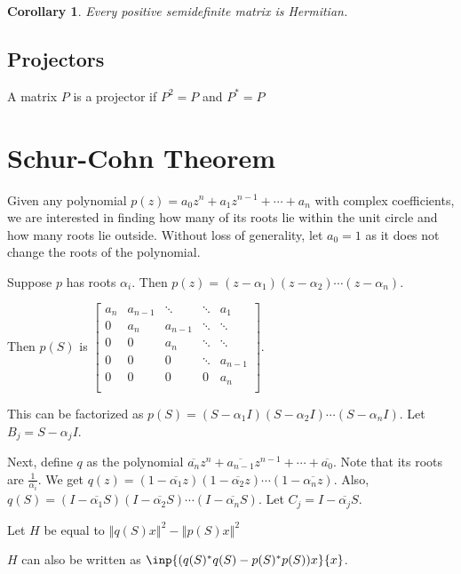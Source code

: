 \documentclass[twofold]{article}
\newcommand*\conj[1]{\overline{#1}}
\newcommand*\adj[1]{#1^*}
\newcommand*\norm[1]{\left \Vert #1 \right\Vert}
\theoremstyle{plain}
\newtheorem*{corollary}{Corollary}
\theoremstyle{definition}
\begin{document}
\begin{corollary}Every positive semidefinite matrix is Hermitian.\end{corollary}

\subsection{Projectors}
A matrix \(P\) is a projector if \(P^2 = P\) and \(\adj{P} = P\)


\section{Schur-Cohn Theorem}

Given any polynomial \(p(z) = a_0 z^n + a_1z^{n-1} + \cdots + a_n\) with complex coefficients, we are interested in finding how many of its roots lie within the unit circle and how many roots lie outside. Without loss of generality, let \(a_0 = 1\) as it does not change the roots of the polynomial. 

Suppose \(p\) has roots \(\alpha_i\). Then \(p(z) = (z - \alpha_1) (z - \alpha_2) \cdots (z - \alpha_n)\). 

 Then \(p(S) \) is \( \begin{bmatrix} 

a_n & a_{n-1} & \ddots & \ddots & a_1 \\
0 & a_n & a_{n-1} & \ddots & \ddots \\
0 & 0 & a_n & \ddots & \ddots \\
0 & 0 & 0 &\ddots & a_{n-1} \\
0 & 0 & 0 & 0 & a_n \\ 
\end{bmatrix}\). 


This can be factorized as \(p(S) = (S - \alpha_1I) (S - \alpha_2 I) \cdots (S - \alpha_n I)\). Let \(B_j = S - \alpha_jI\).

Next, define \(q\) as the polynomial \(\conj{a_n}z^n + \conj{a_{n-1}}z^{n-1} + \cdots + \conj{a_0}\). Note that its roots are \(\frac {1}{\conj{\alpha_i}}\). We get \(q(z) = (1 - \conj{\alpha_1}z) (1 - \conj{\alpha_2}z) \cdots (1 - \conj{\alpha_nz})\). Also, \(q(S) = (I - \conj{\alpha_1}S) (I - \conj{\alpha_2}S) \cdots (I - \conj{\alpha_n}S)\). Let \(C_j= I -  \conj{\alpha_j} S\).


Let \(H\) be equal to \(\norm{ q(S) x }^2 - \norm{ p(S) x}^2\)

\(H\) can also be written as \(\inp{(\adj{q(S)} q(S) - \adj{p(S)} p(S))x}{ x}\).
\end{document}
